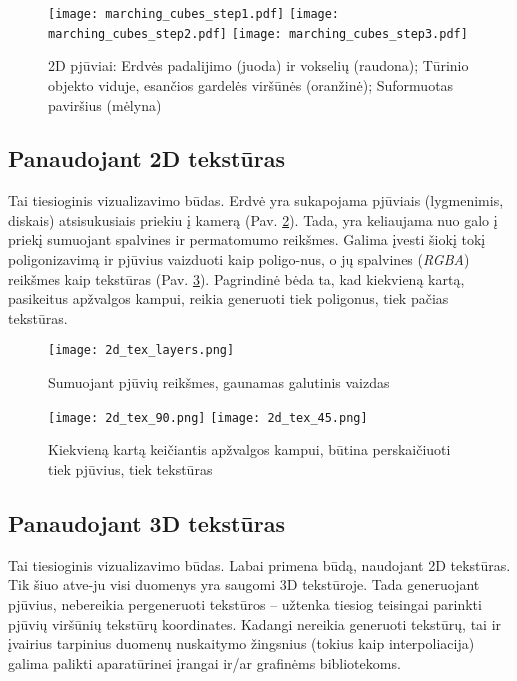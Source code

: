 \begin{figure}[b]
\centering
\texttt{[image: marching\_cubes\_step1.pdf]}
\texttt{[image: marching\_cubes\_step2.pdf]}
\texttt{[image: marching\_cubes\_step3.pdf]}
\caption{2D pjūviai: Erdvės padalijimo (juoda) ir vokselių (raudona); Tūrinio
objekto viduje, esančios gardelės viršūnės (oranžinė); Suformuotas paviršius
(mėlyna)}
\label{fig:marchingcubes_steps}
\end{figure}

\subsection{Panaudojant 2D tekstūras}

Tai tiesioginis vizualizavimo būdas. Erdvė yra sukapojama pjūviais
(lygmenimis, diskais) atsisukusiais priekiu į kamerą (Pav.
\ref{fig:2d_tex_layers}). Tada, yra keliaujama nuo galo į priekį sumuojant
spalvines ir permatomumo reikšmes. Galima įvesti šiokį tokį poligonizavimą ir
pjūvius vaizduoti kaip poligo-nus, o jų spalvines ({\em RGBA}) reikšmes kaip
tekstūras (Pav. \ref{fig:2d_tex_camera}). Pagrindinė bėda ta, kad kiekvieną
kartą, pasikeitus apžvalgos kampui, reikia generuoti tiek poligonus, tiek
pačias tekstūras.

\begin{figure}[!ht]
\centering
\texttt{[image: 2d\_tex\_layers.png]}
\caption{Sumuojant pjūvių reikšmes, gaunamas galutinis vaizdas}
\label{fig:2d_tex_layers}
\end{figure}

\begin{figure}[!ht]
\centering
\texttt{[image: 2d\_tex\_90.png]}
\texttt{[image: 2d\_tex\_45.png]}
\caption{Kiekvieną kartą keičiantis apžvalgos kampui, būtina perskaičiuoti
tiek pjūvius, tiek tekstūras}
\label{fig:2d_tex_camera}
\end{figure}

\clearpage

\subsection{Panaudojant 3D tekstūras}

Tai tiesioginis vizualizavimo būdas. Labai primena būdą, naudojant 2D
tekstūras. Tik šiuo atve-ju visi duomenys yra saugomi 3D tekstūroje.
Tada generuojant pjūvius, nebereikia pergeneruoti tekstūros -- užtenka tiesiog
teisingai parinkti pjūvių viršūnių tekstūrų koordinates. Kadangi nereikia
generuoti tekstūrų, tai ir įvairius tarpinius duomenų nuskaitymo žingsnius
(tokius kaip interpoliacija) galima palikti aparatūrinei įrangai ir/ar
grafinėms bibliotekoms.

